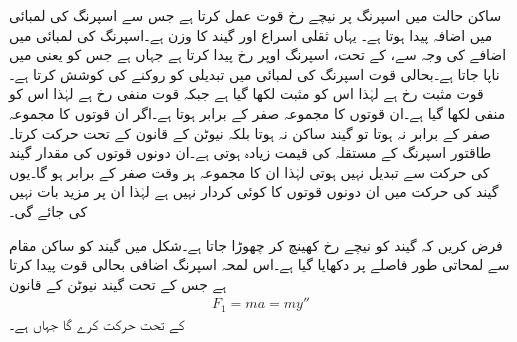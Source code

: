 ساکن حالت میں اسپرنگ پر نیچے رخ قوت  عمل کرتا ہے جس سے  اسپرنگ  کی لمبائی میں  اضافہ پیدا ہوتا ہے۔ یہاں  ثقلی اسراع اور  گیند کا وزن ہے۔اسپرنگ کی لمبائی میں اضافے  کی وجہ سے،  کے تحت، اسپرنگ اوپر رخ     پیدا کرتا ہے جہاں   ہے جس کو  یعنی  میں ناپا جاتا ہے۔بحالی قوت اسپرنگ کی لمبائی میں تبدیلی کو روکنے کی کوشش کرتا ہے۔قوت  مثبت رخ ہے لہٰذا اس کو مثبت لکھا گیا ہے جبکہ قوت  منفی رخ ہے لہٰذا اس کو منفی لکھا گیا ہے۔ان قوتوں کا مجموعہ صفر  کے برابر ہوتا ہے۔اگر ان قوتوں کا مجموعہ صفر کے برابر نہ ہوتا تو گیند ساکن نہ ہوتا بلکہ نیوٹن کے قانون  کے تحت حرکت کرتا۔طاقتور اسپرنگ کے مستقلہ  کی قیمت زیادہ ہوتی ہے۔ان دونوں قوتوں کی مقدار گیند کی حرکت سے تبدیل نہیں ہوتی لہٰذا ان کا مجموعہ ہر وقت صفر کے برابر ہو گا۔یوں گیند کی حرکت میں ان دونوں قوتوں کا کوئی کردار نہیں ہے لہٰذا ان پر مزید بات نہیں کی جائے گی۔

فرض کریں کہ گیند کو نیچے رخ کھینچ کر چھوڑا جاتا ہے۔شکل  میں گیند کو ساکن مقام سے لمحاتی طور  فاصلے پر دکھایا گیا ہے۔اس لمحہ اسپرنگ اضافی بحالی قوت  پیدا کرتا ہے جس کے تحت گیند نیوٹن کے قانون
\begin{align}
F_1=ma = my''
\end{align}
 کے تحت حرکت کرے گا جہاں  ہے۔

